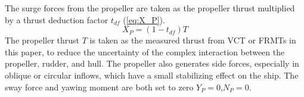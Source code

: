 The surge forces from the propeller are taken as the propeller thrust multiplied by a thrust deduction factor $t_{df}$ (\autoref{eq:X_P}).
\begin{equation}
    \label{eq:X_P}
    X_P = (1-t_{df})T
\end{equation}
The propeller thrust $T$ is taken as the measured thrust from VCT or FRMTs in this paper, to reduce the uncertainty of the complex interaction between the propeller, rudder, and hull. The propeller also generates side forces, especially in oblique or circular inflows, which have a small stabilizing effect on the ship. The sway force and yawing moment are both set to zero $Y_P=0$,$N_P=0$. 